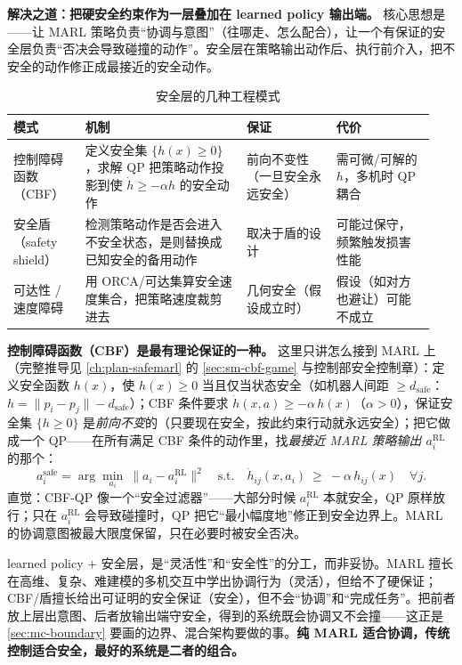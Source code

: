 \textbf{解决之道：把硬安全约束作为一层叠加在 learned policy 输出端。} 核心思想是——让 MARL 策略负责“协调与意图”（往哪走、怎么配合），让一个有保证的安全层负责“否决会导致碰撞的动作”。安全层在策略输出动作后、执行前介入，把不安全的动作修正成最接近的安全动作。

\begin{table}[H]\centering\small
\caption{安全层的几种工程模式}
\label{tab:mc-safety-modes}
\begin{tabular}{p{0.16\linewidth}p{0.36\linewidth}p{0.20\linewidth}p{0.22\linewidth}}
\toprule
模式 & 机制 & 保证 & 代价 \\
\midrule
控制障碍函数（CBF） & 定义安全集 $\{h(x)\ge0\}$，求解 QP 把策略动作投影到使 $\dot h\ge-\alpha h$ 的安全动作 & 前向不变性（一旦安全永远安全） & 需可微/可解的 $h$，多机时 QP 耦合 \\
安全盾（safety shield） & 检测策略动作是否会进入不安全状态，是则替换成已知安全的备用动作 & 取决于盾的设计 & 可能过保守，频繁触发损害性能 \\
可达性 / 速度障碍 & 用 ORCA/可达集算安全速度集合，把策略速度裁剪进去 & 几何安全（假设成立时） & 假设（如对方也避让）可能不成立 \\
\bottomrule
\end{tabular}
\end{table}

\noindent \textbf{控制障碍函数（CBF）是最有理论保证的一种。} 这里只讲怎么接到 MARL 上（完整推导见 \cref{ch:plan-safemarl} 的 \cref{sec:sm-cbf-game} 与控制部安全控制章）：定义安全函数 $h(x)$，使 $h(x)\ge0$ 当且仅当状态安全（如机器人间距 $\ge d_{\text{safe}}$：$h=\|p_i-p_j\|-d_{\text{safe}}$）；CBF 条件要求 $\dot h(x,a)\ge-\alpha\,h(x)$（$\alpha>0$），保证安全集 $\{h\ge0\}$ 是\emph{前向不变}的（只要现在安全，按此约束行动就永远安全）；把它做成一个 QP——在所有满足 CBF 条件的动作里，找\emph{最接近 MARL 策略输出 $a_i^{\mathrm{RL}}$} 的那个：
\begin{equation}
  a_i^{\text{safe}}=\arg\min_{a_i}\ \big\|a_i-a_i^{\mathrm{RL}}\big\|^2\quad\text{s.t.}\quad
  \dot h_{ij}(x,a_i)\ \ge\ -\alpha\,h_{ij}(x)\quad\forall j.
  \label{eq:mc-cbf-filter}
\end{equation}
直觉：CBF-QP 像一个“安全过滤器”——大部分时候 $a_i^{\mathrm{RL}}$ 本就安全，QP 原样放行；只在 $a_i^{\mathrm{RL}}$ 会导致碰撞时，QP 把它“最小幅度地”修正到安全边界上。MARL 的协调意图被最大限度保留，只在必要时被安全否决。

\begin{insight}
learned policy $+$ 安全层，是“灵活性”和“安全性”的分工，而非妥协。MARL 擅长在高维、复杂、难建模的多机交互中学出协调行为（灵活），但给不了硬保证；CBF/盾擅长给出可证明的安全保证（安全），但不会“协调”和“完成任务”。把前者放上层出意图、后者放输出端守安全，得到的系统既会协调又不会撞——这正是 \cref{sec:mc-boundary} 要画的边界、混合架构要做的事。\textbf{纯 MARL 适合协调，传统控制适合安全，最好的系统是二者的组合。}
\end{insight}

